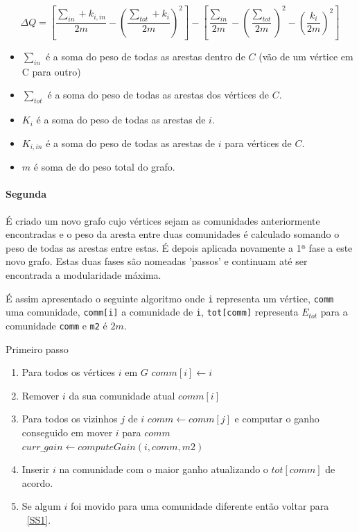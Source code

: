 \begin{equation}
\label{eq:GND}
 \Delta Q  =  [\frac{\sum_{in} + k_{i,in}}{2m} - (\frac{\sum_{tot} +k_i}{2m})^2] - [\frac{\sum_{in}}{2m} - (\frac{\sum_{tot}}{2m})^2 - (\frac{k_i}{2m})^2] 
\end{equation}

\begin{itemize}
	\item $\sum_{in}$ é a soma do peso de todas as arestas dentro de $C$ (vão de um vértice em C para outro)
	\item $\sum_{tot}$ é a soma do peso de todas as arestas dos vértices de $C$. %
	\item $K_i$ é a soma do peso de todas as arestas de $i$. %
	\item $K_{i,in}$ é a soma do peso de todas as arestas de $i$ para vértices de $C$.
	\item $m$ é soma de do peso total do grafo.
\end{itemize}

\paragraph{Segunda}
É criado um novo grafo cujo vértices sejam as comunidades anteriormente encontradas e o peso da aresta entre duas comunidades é calculado somando o peso de todas as arestas entre estas. É depois aplicada novamente a 1ª fase a este novo grafo.
Estas duas fases são nomeadas 'passos' e continuam até ser encontrada a modularidade máxima.


É assim apresentado o seguinte algoritmo onde \verb|i| representa um vértice, \verb|comm| uma comunidade, \verb|comm[i]| a comunidade de \verb|i|, \verb|tot[comm]| representa $E_{tot}$ para a comunidade \verb|comm| e \verb|m2| é $2m$.
\begin{algorithm}
\caption{Primeiro passo}
\label{alg:LMPS}

	\begin{enumerate}
		\item Para todos os vértices $i$ em $G$ $comm[i] \gets i$
		\label{SS1}
		\item Remover $i$ da sua comunidade atual $comm[i]$
		\item Para todos os vizinhos $j$ de $i$ $comm \gets comm[j]$ e computar o ganho conseguido em mover $i$ para $comm$ $curr\_gain \gets computeGain(i,comm,m2)$
		\item Inserir $i$ na comunidade com o maior ganho atualizando o $tot[comm]$ de acordo.
		\item Se algum $i$ foi movido para uma comunidade diferente então voltar para ~\ref{SS1}.
	\end{enumerate}
\end{algorithm}


